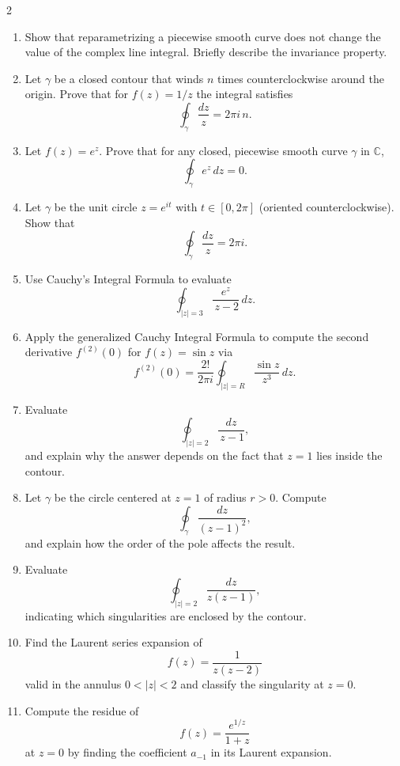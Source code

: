 \begin{multicols}{2}
\begin{enumerate}
  \item Show that reparametrizing a piecewise smooth curve does not change the value of the complex line integral. Briefly describe the invariance property.
  
  \item Let \(\gamma\) be a closed contour that winds \(n\) times counterclockwise around the origin. Prove that for \(f(z)=1/z\) the integral satisfies
  \[
  \oint_{\gamma}\frac{dz}{z}=2\pi i\,n.
  \]

  \item Let \( f(z)=e^z \). Prove that for any closed, piecewise smooth curve \(\gamma\) in \(\mathbb{C}\),
  \[
  \oint_{\gamma} e^z\,dz=0.
  \]
  
  \item Let \(\gamma\) be the unit circle \(z=e^{it}\) with \(t\in[0,2\pi]\) (oriented counterclockwise). Show that
  \[
  \oint_{\gamma} \frac{dz}{z}=2\pi i.
  \]
  
  \item Use Cauchy's Integral Formula to evaluate
  \[
  \oint_{|z|=3}\frac{e^z}{\,z-2}\,dz.
  \]
  
  \item Apply the generalized Cauchy Integral Formula to compute the second derivative \(f^{(2)}(0)\) for \(f(z)=\sin z\) via
  \[
  f^{(2)}(0)=\frac{2!}{2\pi i}\oint_{|z|=R}\frac{\sin z}{z^3}\,dz.
  \]
  
  \item Evaluate
  \[
  \oint_{|z|=2}\frac{dz}{\,z-1},
  \]
  and explain why the answer depends on the fact that \(z=1\) lies inside the contour.
  
  \item Let \(\gamma\) be the circle centered at \(z=1\) of radius \(r>0\). Compute
  \[
  \oint_{\gamma}\frac{dz}{(z-1)^2},
  \]
  and explain how the order of the pole affects the result.
  
  \item Evaluate
  \[
  \oint_{|z|=2}\frac{dz}{z(z-1)},
  \]
  indicating which singularities are enclosed by the contour.
  
  \item Find the Laurent series expansion of
  \[
  f(z)=\frac{1}{z(z-2)}
  \]
  valid in the annulus \(0<|z|<2\) and classify the singularity at \(z=0\).
  
  \item Compute the residue of
  \[
  f(z)=\frac{e^{1/z}}{1+z}
  \]
  at \(z=0\) by finding the coefficient \(a_{-1}\) in its Laurent expansion.
  

\end{enumerate}
\end{multicols}
